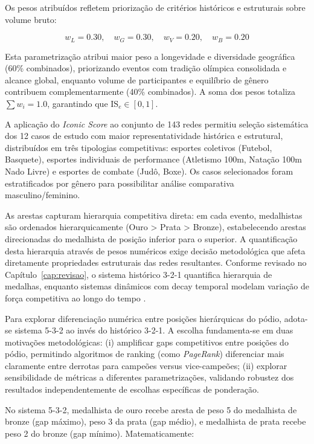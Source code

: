 Os pesos atribuídos refletem priorização de critérios históricos e estruturais sobre volume bruto:

\[
w_L = 0.30, \quad w_G = 0.30, \quad w_V = 0.20, \quad w_B = 0.20
\]

Esta parametrização atribui maior peso a longevidade e diversidade geográfica (60\% combinados), priorizando eventos com tradição olímpica consolidada e alcance global, enquanto volume de participantes e equilíbrio de gênero contribuem complementarmente (40\% combinados). A soma dos pesos totaliza $\sum w_i = 1.0$, garantindo que $\text{IS}_e \in [0, 1]$.

A aplicação do \textit{Iconic Score} ao conjunto de 143 redes permitiu seleção sistemática dos 12 casos de estudo com maior representatividade histórica e estrutural, distribuídos em três tipologias competitivas: esportes coletivos (Futebol, Basquete), esportes individuais de performance (Atletismo 100m, Natação 100m Nado Livre) e esportes de combate (Judô, Boxe). Os casos selecionados foram estratificados por gênero para possibilitar análise comparativa masculino/feminino.

As arestas capturam hierarquia competitiva direta: em cada evento, medalhistas são ordenados hierarquicamente (Ouro > Prata > Bronze), estabelecendo arestas direcionadas do medalhista de posição inferior para o superior. A quantificação desta hierarquia através de pesos numéricos exige decisão metodológica que afeta diretamente propriedades estruturais das redes resultantes. Conforme revisado no Capítulo~\ref{cap:revisao}, o sistema histórico 3-2-1 quantifica hierarquia de medalhas, enquanto sistemas dinâmicos com decay temporal modelam variação de força competitiva ao longo do tempo \cite{Motegi2012NetworkBased}.

Para explorar diferenciação numérica entre posições hierárquicas do pódio, adota-se sistema 5-3-2 ao invés do histórico 3-2-1. A escolha fundamenta-se em duas motivações metodológicas: (i) amplificar gaps competitivos entre posições do pódio, permitindo algoritmos de ranking (como \textit{PageRank}) diferenciar mais claramente entre derrotas para campeões versus vice-campeões; (ii) explorar sensibilidade de métricas a diferentes parametrizações, validando robustez dos resultados independentemente de escolhas específicas de ponderação.

No sistema 5-3-2, medalhista de ouro recebe aresta de peso 5 do medalhista de bronze (gap máximo), peso 3 da prata (gap médio), e medalhista de prata recebe peso 2 do bronze (gap mínimo). Matematicamente:

